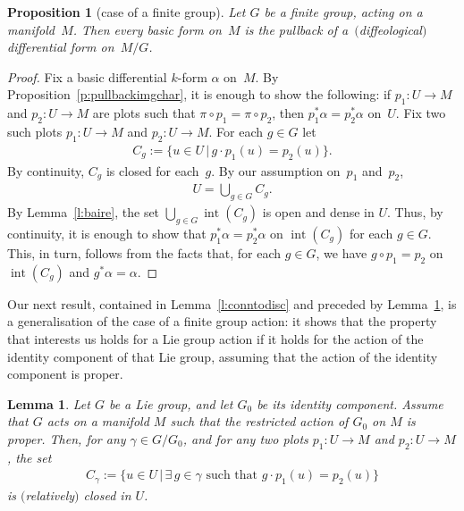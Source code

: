 \documentclass[11pt]{article}
\numberwithin{equation}{section}
\newtheorem{Lemma}[Theorem]{Lemma}
\newtheorem{Proposition}[Theorem]{Proposition}
\newcommand{\inter}{{\operatorname{int}}} %
\newcommand{\hypref}[2]{{#2~\ref{#1}}}
\begin{document}
\begin{Proposition}[case of a f\/inite group] \label{p:finite}
Let $G$ be a finite group, acting on a manifold~$M$.
Then every basic form on~$M$ is the pullback of a~$($diffeological$)$ differential form on~$M/G$.
\end{Proposition}

\begin{proof}
Fix a basic dif\/ferential $k$-form $\alpha$ on~$M$.
By \hypref{p:pullbackimgchar}{Proposition},
it is enough to show the following:
if $p_1 \colon U \to M$ and $p_2 \colon U \to M$ are plots
such that $\pi \circ p_1 = \pi \circ p_2$,
then $p_1^* \alpha = p_2^*\alpha$ on~$U$.
Fix two such plots $p_1 \colon U \to M$ and $p_2 \colon U \to M$.
For each $g \in G$ let
\begin{gather*} C_g := \{ u \in U\,|\, g \cdot p_1(u) = p_2(u) \}.\end{gather*}
By continuity, $C_g$ is closed for each~$g$.
By our assumption on~$p_1$ and~$p_2$,
\begin{gather*} U = \bigcup_{g\in G} C_g. \end{gather*}
By \hypref{l:baire}{Lemma},
the set $\bigcup_{g \in G} \inter(C_g)$
is open and dense in $U$. Thus, by continuity, it is enough to show
that $p_1^* \alpha = p_2^*\alpha$ on $\inter(C_g)$ for each $g \in G$. This, in turn, follows from the facts that, for each $g\in G$, we have $g\circ p_1=p_2$ on $\inter(C_g)$ and $g^*\alpha=\alpha$.
\end{proof}

Our next result, contained in \hypref{l:conntodisc}{Lemma}
and preceded by \hypref{l:C closed}{Lemma},
is a generalisation of the case of a f\/inite group action:
it shows that the property that interests us
holds for a Lie group action
if it holds for the action of the identity component of that
Lie group, assuming that the action of the identity component is proper.


\begin{Lemma}\label{l:C closed}
Let $G$ be a Lie group, and let $G_0$ be its identity component.
Assume that $G$ acts on a manifold $M$ such that the restricted action
of $G_0$ on $M$ is proper. Then, for any $\gamma\in G/G_0$,
and for any two plots $p_1 \colon U \to M$ and $p_2 \colon U \to M$, the set
\begin{gather*} C_\gamma := \{ u \in U\,|\, \exists\, g \in\gamma\text{ such that }
 g\cdot p_1(u)=p_2(u)\}\end{gather*}
is $($relatively$)$ closed in $U$.
\end{Lemma}
\end{document}
